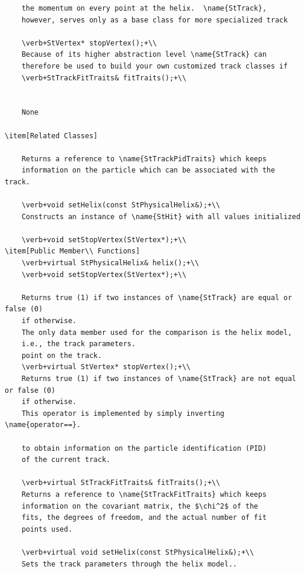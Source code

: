 \begin{enumerate}
\begin{Entry}
\begin{Entry}
{\begin{verbatim}
    the momentum on every point at the helix.  \name{StTrack},
    however, serves only as a base class for more specialized track
    
    \verb+StVertex* stopVertex();+\\
    Because of its higher abstraction level \name{StTrack} can
    therefore be used to build your own customized track classes if
    \verb+StTrackFitTraits& fitTraits();+\\

    
    None
    
\item[Related Classes]
    
    Returns a reference to \name{StTrackPidTraits} which keeps
    information on the particle which can be associated with the track.
    
    \verb+void setHelix(const StPhysicalHelix&);+\\
    Constructs an instance of \name{StHit} with all values initialized
    
    \verb+void setStopVertex(StVertex*);+\\            
\item[Public Member\\ Functions]
    \verb+virtual StPhysicalHelix& helix();+\\
    \verb+void setStopVertex(StVertex*);+\\

    Returns true (1) if two instances of \name{StTrack} are equal or false (0)
    if otherwise.
    The only data member used for the comparison is the helix model,
    i.e., the track parameters.
    point on the track.
    \verb+virtual StVertex* stopVertex();+\\
    Returns true (1) if two instances of \name{StTrack} are not equal or false (0)
    if otherwise. 
    This operator is implemented by simply inverting \name{operator==}.
            
    to obtain information on the particle identification (PID)
    of the current track.

    \verb+virtual StTrackFitTraits& fitTraits();+\\
    Returns a reference to \name{StTrackFitTraits} which keeps
    information on the covariant matrix, the $\chi^2$ of the
    fits, the degrees of freedom, and the actual number of fit
    points used.

    \verb+virtual void setHelix(const StPhysicalHelix&);+\\
    Sets the track parameters through the helix model..


\end{verbatim}}
\end{Entry}
\end{Entry}
\end{enumerate}
